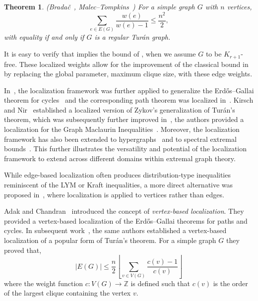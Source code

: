 \documentclass[pdflatex,sn-basic,Numbered]{sn-jnl}
\newtheorem{theorem}{Theorem}
\begin{document}
\begin{theorem}\label{thm:GTuran}\emph{(Brada\v{c}~\cite{bradac}, Malec--Tompkins~\cite{DBLP:journals/ejc/MalecT23})}
For a simple graph $G$ with $n$ vertices,
\begin{equation*}
    \sum_{e \in E(G)} \frac{w(e)}{w(e) - 1} \leq \frac{n^2}{2},
\end{equation*}
with equality if and only if $G$ is a regular Tur\'{a}n graph.
\end{theorem}
    
    It is easy to verify that  implies the bound of , when we assume $G$ to be $K_{r+1}$-free. These localized weights allow for the improvement of the classical bound in  by replacing the global parameter, maximum clique size, with these edge weights.

In~\cite{zhao2025localized}, the localization framework was further applied to generalize the Erd\H{o}s--Gallai theorem for cycles~\cite{gallai1959maximal} and the corresponding path theorem was localized in~\cite{DBLP:journals/ejc/MalecT23}. Kirsch and Nir~\cite{Kirsch_2024} established a localized version of Zykov’s generalization \cite{Zykov1949-qr} of Turán’s theorem, which was subsequently further improved in~\cite{aragao2024localised}, the authors provided a localization for the Graph Maclaurin Inequalities~\cite{khadzhiivanov1977inequalities}. Moreover, the localization framework has also been extended to hypergraphs~\cite{zhao2025localizedhyper} and to spectral extremal bounds~\cite{liu2026local,kannan2025localizationspectralturantypetheorems}. This further illustrates the versatility and potential of the localization framework to extend across different domains within extremal graph theory.


While edge-based localization often produces distribution-type inequalities reminiscent of the LYM or Kraft inequalities, a more direct alternative was proposed in~\cite{adak2025vertex}, where localization is applied to vertices rather than edges.

Adak and Chandran~\cite{adak2025vertex} introduced the concept of \emph{vertex-based localization}. They provided a vertex-based localization of the Erd\H{o}s--Gallai theorems for paths and cycles. In subsequent work~\cite{adak2025turan}, the same authors established a vertex-based localization of a popular form of Turán’s theorem. For a simple graph $G$ they proved that,
\[|E(G)| \leq \frac{n}{2}\left\lfloor\sum_{v \in V(G)}\frac{c(v)-1}{c(v)}\right\rfloor\] where the weight function $c: V(G) \rightarrow \mathbb{Z}$ is defined such that $c(v)$ is the order of the largest clique containing the vertex $v$.
\end{document}
